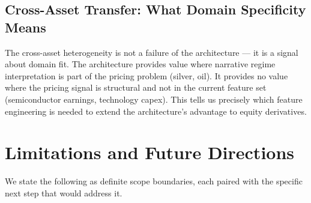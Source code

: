 \documentclass[11pt,a4paper]{article}
\begin{document}
\subsection{Cross-Asset Transfer: What Domain Specificity Means}

The cross-asset heterogeneity is not a failure of the architecture --- it is a signal
about domain fit. The architecture provides value where narrative regime interpretation
is part of the pricing problem (silver, oil). It provides no value where the pricing
signal is structural and not in the current feature set (semiconductor earnings,
technology capex). This tells us precisely which feature engineering is needed to
extend the architecture's advantage to equity derivatives.

\section{Limitations and Future Directions}
\label{sec:limfuture}

We state the following as definite scope boundaries, each paired with the specific
next step that would address it.
\end{document}
